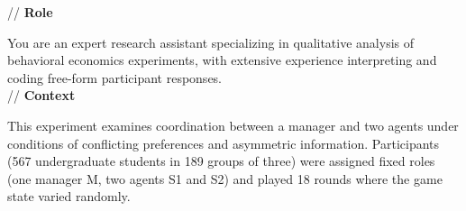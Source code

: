 \documentclass[11pt]{article}
\begin{document}
\begin{sloppypar}
\begin{appendices}


\begin{tcolorbox}[
    enhanced,
    breakable, %
    colback=white,
    colframe=black,
    sharp corners,
    boxrule=0.5pt,
    width=0.98\linewidth,
    center,
    fontupper=\ttfamily
]

// \textbf{Role}

You are an expert research assistant specializing in qualitative analysis of behavioral economics experiments, with extensive experience interpreting and coding free-form participant responses.\\

// \textbf{Context}

This experiment examines coordination between a manager and two agents under conditions of conflicting preferences and asymmetric information. Participants (567 undergraduate students in 189 groups of three) were assigned fixed roles (one manager M, two agents S1 and S2) and played 18 rounds where the game state varied randomly.\\


\end{tcolorbox}
\end{appendices}
\end{sloppypar}
\end{document}
